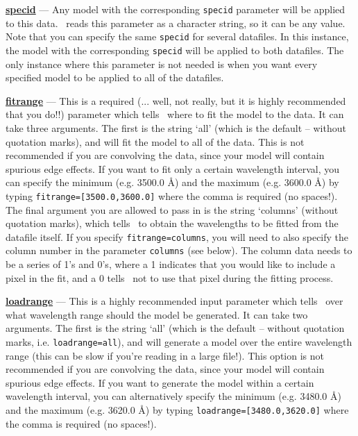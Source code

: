\textbf{\underline{specid}} --- Any model with the corresponding
   \texttt{specid} parameter will be applied to this data. \alis\ reads
   this parameter as a character string, so it can be any value. Note
   that you can specify the same \texttt{specid} for several datafiles.
   In this instance, the model with the corresponding \texttt{specid}
   will be applied to both datafiles. The only instance where this
   parameter is not needed is when you want every specified model
   to be applied to all of the datafiles.

\textbf{\underline{fitrange}} --- This is a required (... well, not really, but it is highly
     recommended that you do!!) parameter
     which tells \alis\ where to fit the model to the data. It can take three arguments.
     The first is the string `all' (which is the default -- without quotation marks), and
     will fit the model to all of the data. This is not recommended if you are convolving
     the data, since your model will contain spurious edge effects. If you want to fit
     only a certain wavelength interval, you can specify the minimum (e.g. 3500.0 \AA)
     and the maximum (e.g. 3600.0 \AA) by typing \texttt{fitrange=[3500.0,3600.0]} where
     the comma is required (no spaces!). The final argument you are allowed to pass in
     is the string `columns' (without quotation marks), which tells \alis\ to obtain the
     wavelengths to be fitted from the datafile itself. If you specify \texttt{fitrange=columns},
     you will need to also specify the column number in the parameter \texttt{columns}
     (see below). The column data needs to be a series of 1's and 0's, where a 1 indicates
     that you would like to include a pixel in the fit, and a 0 tells \alis\ not to use that pixel
     during the fitting process.

\textbf{\underline{loadrange}} --- This is a highly recommended input parameter
     which tells \alis\ over what wavelength range should the model be generated. It can take two arguments.
     The first is the string `all' (which is the default -- without quotation marks, i.e. \texttt{loadrange=all}), and
     will generate a model over the entire wavelength range (this can be slow if you're reading in a large file!).
     This option is not recommended if you are convolving
     the data, since your model will contain spurious edge effects. If you want to generate
     the model within a certain wavelength interval, you can alternatively specify the minimum (e.g. 3480.0 \AA)
     and the maximum (e.g. 3620.0 \AA) by typing \texttt{loadrange=[3480.0,3620.0]} where
     the comma is required (no spaces!).

